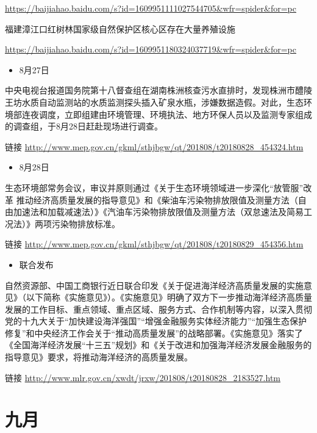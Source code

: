 \documentclass[]{book}
\providecommand{\tightlist}{%
  \setlength{\itemsep}{0pt}\setlength{\parskip}{0pt}}
\begin{document}
\url{https://baijiahao.baidu.com/s?id=1609951111027544705\&wfr=spider\&for=pc}

福建漳江口红树林国家级自然保护区核心区存在大量养殖设施

\url{https://baijiahao.baidu.com/s?id=1609951180324037719\&wfr=spider\&for=pc}

\begin{itemize}
\tightlist
\item
  8月27日
\end{itemize}

中央电视台报道国务院第十八督查组在湖南株洲核查污水直排时，发现株洲市醴陵王坊水质自动监测站的水质监测探头插入矿泉水瓶，涉嫌数据造假。对此，生态环境部连夜调度，立即组建由环境管理、环境执法、地方环保人员以及监测专家组成的调查组，于8月28日赶赴现场进行调查。

链接 \url{http://www.mep.gov.cn/gkml/sthjbgw/qt/201808/t20180828_454324.htm}

\begin{itemize}
\tightlist
\item
  8月28日
\end{itemize}

生态环境部常务会议，审议并原则通过《关于生态环境领域进一步深化``放管服''改革 推动经济高质量发展的指导意见》和《柴油车污染物排放限值及测量方法（自由加速法和加载减速法）》《汽油车污染物排放限值及测量方法（双怠速法及简易工况法）》两项污染物排放标准。

链接 \url{http://www.mep.gov.cn/gkml/sthjbgw/qt/201808/t20180829_454356.htm}

\begin{itemize}
\tightlist
\item
  联合发布
\end{itemize}

自然资源部、中国工商银行近日联合印发《关于促进海洋经济高质量发展的实施意见》（以下简称《实施意见》）。《实施意见》明确了双方下一步推动海洋经济高质量发展的工作目标、重点领域、重点区域、服务方式、合作机制等内容，以深入贯彻党的十九大关于``加快建设海洋强国''``增强金融服务实体经济能力''``加强生态保护修复''和中央经济工作会关于``推动高质量发展''的战略部署。《实施意见》落实了《全国海洋经济发展``十三五''规划》和《关于改进和加强海洋经济发展金融服务的指导意见》要求，将推动海洋经济的高质量发展。

链接 \url{http://www.mlr.gov.cn/xwdt/jrxw/201808/t20180828_2183527.htm}

\hypertarget{ux4e5dux6708}{%
\section*{九月}\label{ux4e5dux6708}}
\end{document}
